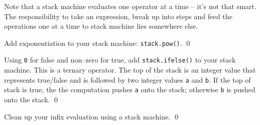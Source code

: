 Note that a stack machine evaluates one operator at a time --
it's not that smart.
The responsibility to
take an expression, break up into
steps and feed the operations one at a time to
stack machine lies somewhere else.

\begin{ex}
Add exponentiation to your stack machine: \texttt{stack.pow()}.
\qed
\end{ex}

\begin{ex}
Using \texttt{0} for false and non--zero for true,
add \texttt{stack.ifelse()} to your stack machine.
This is a ternary operator.
The top of the stack is an integer value that represents
true/false and is followed by two integer values \texttt{a} and \texttt{b}.
If the top of stack is true, the the computation pushes \texttt{a}
onto the stack; otherwise \texttt{b} is pushed onto the stack.
\qed
\end{ex}

\begin{ex}
Clean up your infix evaluation using a stack machine.
\qed
\end{ex}

